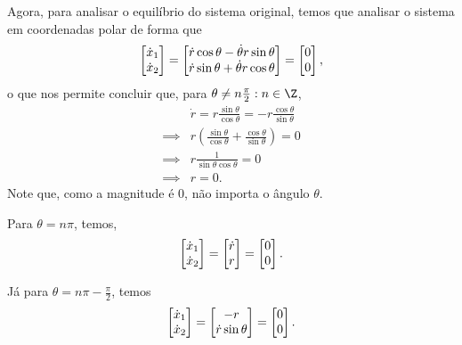 \documentclass[a4paper]{report}
\begin{document}
Agora, para analisar o equilíbrio do sistema original, temos que analisar o sistema em coordenadas polar de forma que \[
    \begin{bmatrix} \dot{x}_1 \\ \dot{x}_2 \end{bmatrix} = \begin{bmatrix} 
    \dot{r}\cos\theta -\dot{\theta}r\sin\theta \\
    \dot{r}\sin\theta + \dot{\theta}r\cos\theta
\end{bmatrix} = \begin{bmatrix} 0 \\ 0 \end{bmatrix}  \\
,\] o que nos permite concluir que, para $\theta \neq n\frac{\pi}{2} : n\in \Z$,
\begin{align*}
    &\dot{r} = r \frac{\sin\theta}{\cos\theta} = -r \frac{\cos\theta}{\sin\theta} \\
    \implies& r\left( \frac{\sin\theta}{\cos\theta} + \frac{\cos\theta}{\sin\theta} \right) = 0 \\
    \implies& r \frac{1}{\sin\theta\cos\theta} = 0 \\
    \implies& r = 0
.\end{align*}
Note que, como a magnitude é 0, não importa o ângulo $\theta$.

Para $\theta=n\pi$, temos, \[
    \begin{bmatrix} \dot{x}_1 \\ \dot{x}_2 \end{bmatrix} = \begin{bmatrix} 
    \dot{r}  \\
    r
\end{bmatrix} = \begin{bmatrix} 0 \\ 0 \end{bmatrix}  \\
.\]

Já para $\theta = n\pi - \frac{\pi}{2}$, temos \[
    \begin{bmatrix} \dot{x}_1 \\ \dot{x}_2 \end{bmatrix} = \begin{bmatrix} 
    -r \\
    \dot{r}\sin\theta
\end{bmatrix} = \begin{bmatrix} 0 \\ 0 \end{bmatrix}  \\
.\]
\end{document}

